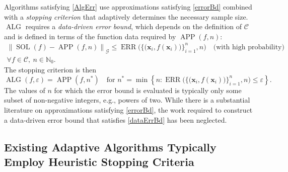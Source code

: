 \documentclass[11pt]{NSFamsart}
\DeclareMathOperator{\erf}{erf}
\newcommand{\natzero}{{\mathbb{N}_0}}
\DeclareMathOperator{\SOL}{SOL}
\DeclareMathOperator{\APP}{APP}
\DeclareMathOperator{\ALG}{ALG}
\DeclareMathOperator{\ERR}{ERR}
\newcommand{\bx}{{\boldsymbol{x}}}
\newcommand{\cc}{\mathcal{C}}
\newcommand{\calc}{{\mathcal{C}}}
\newcommand{\calf}{{\mathcal{F}}}
\newcommand{\calg}{{\mathcal{G}}}
\newcommand{\norm}[2][{}]{\ensuremath{\left \lVert #2 \right \rVert}_{#1}}
\newcommand{\dataN}{\bigl\{\bigl(\bx_i,f(\bx_i)\bigr)\bigr\}_{i=1}^n}
\newcommand{\ErrN}{\ERR\bigl(\dataN,n\bigr)}
\begin{document}
Algorithms satisfying \eqref{AlgErr} use approximations satisfying \eqref{errorBd} combined with a \emph{stopping criterion} that adaptively determines the necessary sample size.  $\ALG$ requires a \emph{data-driven error bound}, which depends on the definition of $\calc$ and is defined in terms of the function data required by $\APP(f,n)$:
\begin{multline} \label{dataErrBd} \tag{DATA-BD}
\norm[\calg]{\SOL(f) - \APP(f,n)} \le \ErrN \quad \text{(with high probability)} \\ \forall f \in \cc, \ n \in \natzero.
\end{multline}
The stopping criterion is then
\begin{equation} \label{stopCrit} \tag{STOP}
\ALG(f,\varepsilon) = \APP(f,n^*) \quad \text{for } n^* = \min \left \{ n : \ErrN \le \varepsilon \right \}.
\end{equation}
The values of $n$ for which the error bound is evaluated is typically only some subset of non-negative integers, e.g., powers of two.  While there is a substantial literature on approximations satisfying \eqref{errorBd}, the work required to construct a data-driven error bound that satisfies \eqref{dataErrBd} has been neglected. 

\subsection{Existing Adaptive Algorithms Typically Employ Heuristic Stopping Criteria} \label{sec:Heuristics}
\end{document}
